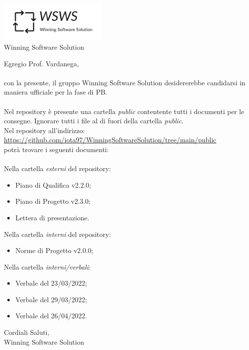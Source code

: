 \documentclass[a4paper, 12pt]{letter}
\begin{document}
\begin{center}
\includegraphics[width=0.4\textwidth]{WSWS-logos_transparent_crop}\\
{\Large Winning Software Solution}\\[24pt]
\end{center}
Egregio Prof. Vardanega,\\\\
con la presente, il gruppo Winning Software Solution desidererebbe candidarsi in maniera ufficiale
per la fase di PB.\\\\
Nel repository è presente una cartella \textit{public} contentente tutti i documenti per le consegne. Ignorare tutti i file
al di fuori della cartella \textit{public}.\\
Nel repository all'indirizzo: \\
\href{https://github.com/iota97/WinningSoftwareSolution/tree/main/public}{\underline{https://github.com/iota97/WinningSoftwareSolution/tree/main/public}}\\ 
potrà trovare i seguenti documenti:\\\\

Nella cartella \textit{esterni} del repository:
\begin{itemize}
\item Piano di Qualifica v2.2.0;
\item Piano di Progetto v2.3.0;
\item Lettera di presentazione.
\end{itemize}
Nella cartella \textit{interni} del repository:
\begin{itemize}
    \item Norme di Progetto v2.0.0;
\end{itemize}

Nella cartella \textit{interni/verbali}:
\begin{itemize}
    \item Verbale del 23/03/2022;
    \item Verbale del 29/03/2022;
    \item Verbale del 26/04/2022.
\end{itemize}
\begin{flushright}
Cordiali Saluti,\\
Winning Software Solution
\end{flushright}
\end{document}
